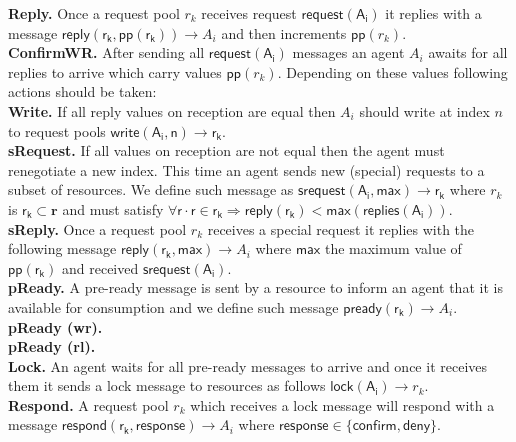 \noindent \textbf{Reply.} Once a request pool $r_k$ receives request $\mathsf{request(A_i)}$ it replies with a message $\mathsf{reply(\mathsf r_k, {pp}(r_k))} \rightarrow A_i$ and then increments $\mathsf{pp}(r_k)$. \\

\noindent \textbf{ConfirmWR.} After sending all $\mathsf{request(A_i)}$ messages an agent $A_i$ awaits for all replies to arrive which carry values $\mathsf{pp}(r_k)$. Depending on these values following actions should be taken: \\

\textbf{Write.} If all reply values on reception are equal then $A_i$ should write at index $n$ to request pools $\mathsf{write(A_i, n) \rightarrow r_k}$. \\

\textbf{sRequest.} If all values on reception are not equal then the agent must renegotiate a new index. This time an agent sends new (special) requests to a subset of resources. We define such message as \textbf{$\mathsf{srequest(A_i, max) \rightarrow r_k}$} where $r_k$ is $\mathsf{r_k \subset \mathbf{r}}$ and must satisfy $\mathsf{\forall r \cdot r \in r_k \Rightarrow reply(r_k)} < \mathsf{max(replies(A_i))}$.  \\

\textbf{sReply.}  Once a request pool $r_k$ receives a special request it replies with the following message $\mathsf{reply(\mathsf r_k, max)} \rightarrow A_i$ where $\mathsf{max}$ the maximum value of $\mathsf{pp(r_k)}$ and received $\mathsf{srequest(A_i)}$. \\

\noindent \textbf{pReady.} A pre-ready message is sent by a resource to inform an agent that it is available for consumption and we define such message $\mathsf{pready(\mathsf r_k)} \rightarrow A_i$.\\

\textbf{pReady (wr).} \\

\textbf{pReady (rl).} \\

\noindent \textbf{Lock.} An agent waits for all pre-ready messages to arrive and once it receives them it sends a lock message to resources as follows $\mathsf{lock(\mathsf A_i)} \rightarrow r_k$.\\

\noindent \textbf{Respond.} A request pool $r_k$ which receives a lock message will respond with a message $\mathsf{respond(\mathsf r_k, response)} \rightarrow A_i$ where $\mathsf{response \in \{confirm, deny\}}$. \\

